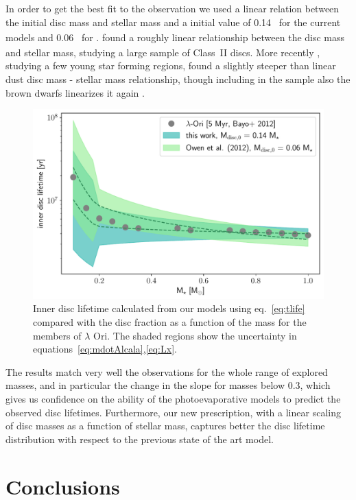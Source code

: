 \documentclass[usenatbib,useAMS,usedcolumn]{mnras}
\begin{document}
In order to get the best fit to the observation we used a linear relation between the initial disc mass and stellar mass and a initial value of \SI{0.14}{_\star} for the current models and \SI{0.06}{_\star} for .
 found a roughly linear relationship between the disc mass and stellar mass, studying a large sample of Class~II discs. More recently , studying a few young star forming regions, found a slightly steeper than linear dust disc mass - stellar mass relationship, though including in the sample also the brown dwarfs linearizes it again .
\begin{figure}
    \centering
    \includegraphics[width=\columnwidth]{Figure11}
    \caption{Inner disc lifetime calculated from our models using eq.~\ref{eq:tlife} compared with the disc fraction as a function of the mass for the members of $\lambda$ Ori. The shaded regions show the uncertainty in equations~\ref{eq:mdotAlcala},\ref{eq:Lx}. \label{fig:obs}}
\end{figure}
The results match very well the observations for the whole range of explored masses, and in particular the change in the slope for masses below \SI{0.3}{\solarmass}, which gives us confidence on the ability of the photoevaporative models to predict the observed disc lifetimes. Furthermore, our new prescription, with a linear scaling of disc masses as a function of stellar mass, captures better the disc lifetime distribution with respect to the previous state of the art model.

\section{Conclusions}\label{sec:conclusions}
\end{document}
